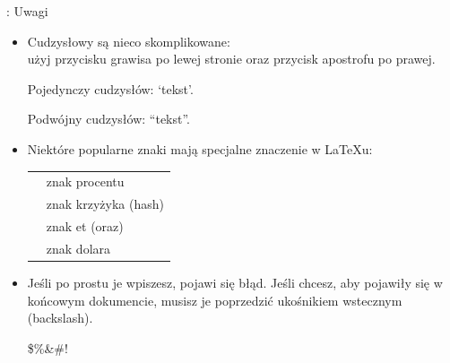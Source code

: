 \documentclass{beamer}
\begin{document}
\begin{frame}[fragile]{\insertsubsection{}: Uwagi}
\small
\begin{itemize}
\item Cudzysłowy są nieco skomplikowane:\\
użyj przycisku grawisa \keystroke{\`{}} po lewej stronie oraz przycisk apostrofu \keystroke{\'{}} po prawej.
\begin{exampletwouptiny}
Pojedynczy cudzysłów: `tekst'.

Podwójny cudzysłów: ``tekst''.
\end{exampletwouptiny}

\item Niektóre popularne znaki mają specjalne znaczenie w \LaTeX u:\\[1ex]
\begin{tabular}{cl}
\keystrokebftt{\%} & znak procentu              \\
\keystrokebftt{\#} & znak krzyżyka (hash)       \\
\keystrokebftt{\&} & znak et (oraz)             \\
\keystrokebftt{\$} & znak dolara                \\
\end{tabular}
\item Jeśli po prostu je wpiszesz, pojawi się błąd. Jeśli chcesz, aby pojawiły się w
końcowym dokumencie, musisz je poprzedzić ukośnikiem wstecznym (backslash).
\begin{exampletwoup}
\$\%\&\#!
\end{exampletwoup}
\end{itemize}
\end{frame}
\end{document}
